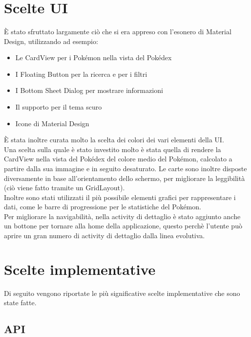 \documentclass[a4paper,11pt]{article}
\begin{document}
	\section{Scelte UI}
		\paragraph{}
			È stato sfruttato largamente ciò che si era appreso con l’esonero di Material Design, utilizzando ad esempio:
			\begin{itemize}
				\item Le CardView per i Pokémon nella vista del Pokédex
				\item I Floating Button per la ricerca e per i filtri
				\item I Bottom Sheet Dialog per mostrare informazioni
				\item Il supporto per il tema scuro
				\item Icone di Material Design
			\end{itemize} 
			È stata inoltre curata molto la scelta dei colori dei vari elementi della UI.\\
			Una scelta sulla quale è stato investito molto è stata quella di rendere la CardView nella vista del Pokédex del colore medio del Pokémon, calcolato a partire dalla sua immagine e in seguito desaturato. Le carte sono inoltre disposte diversamente in base all’orientamento dello schermo, per migliorare la leggibilità (ciò viene fatto tramite un GridLayout).\\
			Inoltre sono stati utilizzati il più possibile elementi grafici per rappresentare i dati, come le barre di progressione per le statistiche del Pokémon.\\
			Per migliorare la navigabilità, nella activity di dettaglio è stato aggiunto anche un bottone per tornare alla home della applicazione, questo perchè l’utente può aprire un gran numero di activity di dettaglio dalla linea evolutiva. \newpage
 
  	\section{Scelte implementative}
  		\paragraph{}
  			Di seguito vengono riportate le più significative scelte implementative che sono state fatte.
  				\subsection{API}
\end{document}
